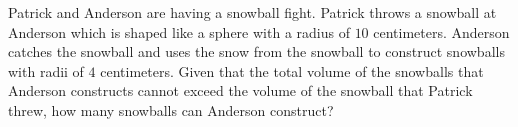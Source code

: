 Patrick and Anderson are having a snowball fight. Patrick throws a snowball at Anderson which is shaped like a sphere with a radius of $10$ centimeters. Anderson catches the snowball and uses the snow from the snowball to construct snowballs with radii of $4$ centimeters. Given that the total volume of the snowballs that Anderson constructs cannot exceed the volume of the snowball that Patrick threw, how many snowballs can Anderson construct?